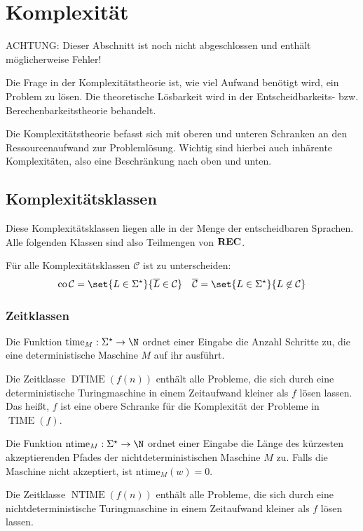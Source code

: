 \chapter{Komplexität}
{\color{red}ACHTUNG: Dieser Abschnitt ist noch nicht abgeschlossen und enthält möglicherweise Fehler!}

Die Frage in der Komplexitätstheorie ist, wie viel Aufwand benötigt wird, ein Problem zu lösen.
Die theoretische Lösbarkeit wird in der Entscheidbarkeits- bzw. Berechenbarkeitstheorie behandelt.

Die Komplexitätstheorie befasst sich mit oberen und unteren Schranken an den Ressourcenaufwand zur Problemlösung.
Wichtig sind hierbei auch inhärente Komplexitäten, also eine Beschränkung nach oben und unten.
\section{Komplexitätsklassen}
Diese Komplexitätsklassen liegen alle in der Menge der entscheidbaren Sprachen. Alle folgenden Klassen sind also Teilmengen von $\operatorname{\mathbf{REC}}$.

Für alle Komplexitätsklassen $\mathcal C$ ist zu unterscheiden:
\begin{align*}
	\operatorname{co}\mathcal C=\set{L\in\Sigma^\star}{\overline L \in\mathcal C} && \overline{\mathcal C}=\set{L\in\Sigma^\star}{L\not\in \mathcal C}
\end{align*}
\subsection{Zeitklassen}
\begin{multicols}{2}
	Die Funktion $\mathrm{time}_M:\Sigma^\star\rightarrow \N$ ordnet einer Eingabe die Anzahl Schritte zu, die eine deterministische Maschine $M$ auf ihr ausführt.

	Die Zeitklasse $\operatorname{DTIME}(f(n))$ enthält alle Probleme, die sich durch eine deterministische Turingmaschine in einem Zeitaufwand kleiner als $f$ lösen lassen. Das heißt, $f$ ist eine obere Schranke für die Komplexität der Probleme in $\operatorname{TIME}(f)$.

	\columnbreak

	Die Funktion $\mathrm{ntime}_M:\Sigma^\star\rightarrow \N$ ordnet einer Eingabe die Länge des kürzesten akzeptierenden Pfades der nichtdeterministischen Maschine $M$ zu. Falls die Maschine nicht akzeptiert, ist $\mathrm{ntime}_M(w)=0$.

	Die Zeitklasse $\operatorname{NTIME}(f(n))$ enthält alle Probleme, die sich durch eine nichtdeterministische Turingmaschine in einem Zeitaufwand kleiner als $f$ lösen lassen.
\end{multicols}



